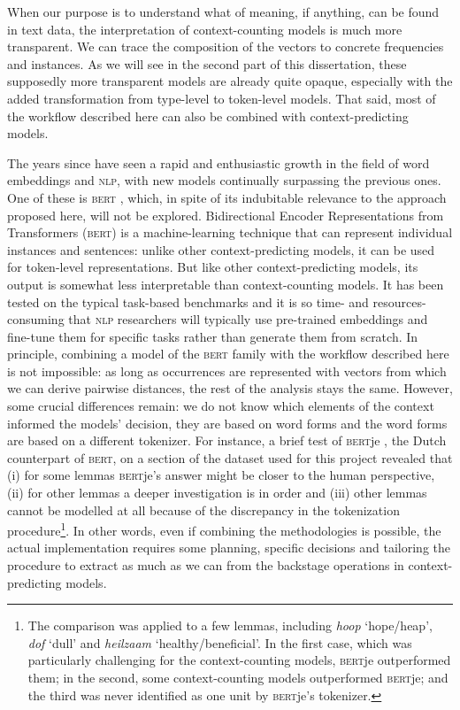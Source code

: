 \documentclass[
]{book}
\begin{document}
When our purpose is to understand what of meaning, if anything, can be found in text data, the interpretation of context-counting models is much more transparent. We can trace the composition of the vectors to concrete frequencies and instances. As we will see in the second part of this dissertation, these supposedly more transparent models are already quite opaque, especially with the added transformation from type-level to token-level models. That said, most of the workflow described here can also be combined with context-predicting models.

The years since \textcite{mikolov.etal_2013} have seen a rapid and enthusiastic growth in the field of word embeddings and \textsc{nlp}, with new models continually surpassing the previous ones. One of these is \textsc{bert} \autocite{BERT}, which, in spite of its indubitable relevance to the approach proposed here, will not be explored. Bidirectional Encoder Representations from Transformers (\textsc{bert}) is a machine-learning technique that can represent individual instances and sentences: unlike other context-predicting models, it can be used for token-level representations. But like other context-predicting models, its output is somewhat less interpretable than context-counting models. It has been tested on the typical task-based benchmarks and it is so time- and resources-consuming that \textsc{nlp} researchers will typically use pre-trained embeddings and fine-tune them for specific tasks rather than generate them from scratch. In principle, combining a model of the \textsc{bert} family with the workflow described here is not impossible: as long as occurrences are represented with vectors from which we can derive pairwise distances, the rest of the analysis stays the same. However, some crucial differences remain: we do not know which elements of the context informed the models' decision, they are based on word forms and the word forms are based on a different tokenizer. For instance, a brief test of \textsc{bert}je \autocite{devries.etal_2019}, the Dutch counterpart of \textsc{bert}, on a section of the dataset used for this project revealed that (i) for some lemmas \textsc{bert}je's answer might be closer to the human perspective, (ii) for other lemmas a deeper investigation is in order and (iii) other lemmas cannot be modelled at all because of the discrepancy in the tokenization procedure\footnote{The comparison was applied to a few lemmas, including \emph{hoop} `hope/heap', \emph{dof} `dull' and \emph{heilzaam} `healthy/beneficial'. In the first case, which was particularly challenging for the context-counting models, \textsc{bert}je outperformed them; in the second, some context-counting models outperformed \textsc{bert}je; and the third was never identified as one unit by \textsc{bert}je's tokenizer.}. In other words, even if combining the methodologies is possible, the actual implementation requires some planning, specific decisions and tailoring the procedure to extract as much as we can from the backstage operations in context-predicting models.
\end{document}

